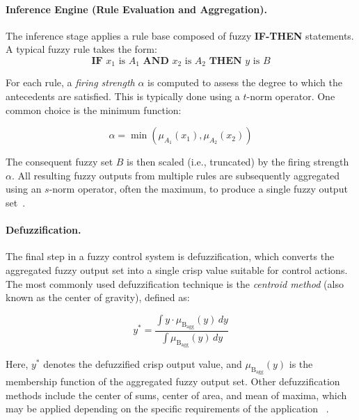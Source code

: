 \paragraph{Inference Engine (Rule Evaluation and Aggregation).}
The inference stage applies a rule base composed of fuzzy \textbf{IF-THEN} statements. A typical fuzzy rule takes the form: 
\begin{equation}
\textbf{IF } x_1 \text{ is } A_1 \textbf{ AND } x_2 \text{ is } A_2 \textbf{ THEN } y \text{ is } B \label{eq:fuzzy-rule_general}
\end{equation}

For each rule, a \textit{firing strength} $\alpha$ is computed to assess the degree to which the antecedents are satisfied. This is typically done using a $t$-norm operator. One common choice is the minimum function:

\begin{equation}
\alpha = \min \left( \mu_{A_1}(x_1), \mu_{A_2}(x_2) \right)
\label{eq:firing-strength}
\end{equation}

The consequent fuzzy set $B$ is then scaled (i.e., truncated) by the firing strength $\alpha$. All resulting fuzzy outputs from multiple rules are subsequently aggregated using an $s$-norm operator, often the maximum, to produce a single fuzzy output set~\parencite{kumari2024modelling, arun2017modeling, praharaj2022modeling}.

\paragraph{Defuzzification.}
The final step in a fuzzy control system is defuzzification, which converts the aggregated fuzzy output set into a single crisp value suitable for control actions. The most commonly used defuzzification technique is the \textit{centroid method} (also known as the center of gravity), defined as:

\begin{equation}
y^* = \frac{ \int y \cdot \mu_{\text{B}_{\text{agg}}}(y) \, dy }{ \int \mu_{\text{B}_{\text{agg}}}(y) \, dy }
\label{eq:centroid}
\end{equation}

Here, $y^*$ denotes the defuzzified crisp output value, and $\mu_{\text{B}_{\text{agg}}}(y)$ is the membership function of the aggregated fuzzy output set. Other defuzzification methods include the center of sums, center of area, and mean of maxima, which may be applied depending on the specific requirements of the application~\parencite{praharaj2022modeling, arun2018modelling}
.



